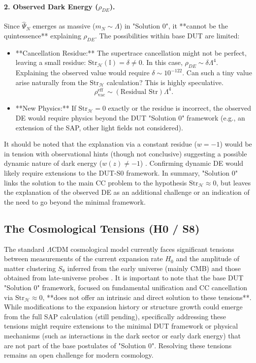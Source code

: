 \documentclass[11pt, a4paper]{article}
\theoremstyle{remark}
\newcommand{\Op}[1]{\hat{#1}}
\newcommand{\Str}{\mathrm{Str}}
\begin{document}
\paragraph{2. Observed Dark Energy (\( \rho_{DE} \)).}
Since \( \Op{\Psi}_N \) emerges as massive (\( m_N \sim \Lambda \)) in "Solution 0", it **cannot be the quintessence** explaining \( \rho_{DE} \). The possibilities within base DUT are limited:
\begin{itemize}
    \item **Cancellation Residue:** The supertrace cancellation might not be perfect, leaving a small residue: \( \Str_{\mathcal{H}}(\mathbb{I}) = \delta \neq 0 \). In this case, \( \rho_{DE} \sim \delta \Lambda^4 \). Explaining the observed value would require \( \delta \sim 10^{-122} \). Can such a tiny value arise naturally from the \( \Str_{\mathcal{H}} \) calculation? This is highly speculative.
    \begin{equation}\label{eq:residuo_vacio_final_redux}
    \rho_{\text{vac}}^{\text{eff}} \sim (\text{Residual } \Str) \Lambda^4.
    \end{equation}
    \item **New Physics:** If \( \Str_{\mathcal{H}} = 0 \) exactly or the residue is incorrect, the observed DE would require physics beyond the DUT "Solution 0" framework (e.g., an extension of the SAP, other light fields not considered).
\end{itemize}
It should be noted that the explanation via a constant residue (\(w=-1\)) would be in tension with observational hints (though not conclusive) suggesting a possible dynamic nature of dark energy (\(w(z) \neq -1\)) \citep[see e.g., analysis in][]{DESI:2024mwx, Abdalla:2022}. Confirming dynamic DE would likely require extensions to the DUT-S0 framework.
In summary, "Solution 0" links the solution to the main CC problem to the hypothesis \( \Str_{\mathcal{H}} \approx 0 \), but leaves the explanation of the observed DE as an additional challenge or an indication of the need to go beyond the minimal framework.

\subsection{The Cosmological Tensions (H0 / S8)}
\label{sec:tensiones_cosmo}
The standard $\Lambda$CDM cosmological model currently faces significant tensions between measurements of the current expansion rate \(H_0\) and the amplitude of matter clustering \(S_8\) inferred from the early universe (mainly CMB) and those obtained from late-universe probes \citep[e.g.,][]{Abdalla:2022}. It is important to note that the base DUT "Solution 0" framework, focused on fundamental unification and CC cancellation via \(\Str_{\mathcal{H}} \approx 0\), **does not offer an intrinsic and direct solution to these tensions**. While modifications to the expansion history or structure growth could emerge from the full SAP calculation (still pending), specifically addressing these tensions might require extensions to the minimal DUT framework or physical mechanisms (such as interactions in the dark sector or early dark energy) that are not part of the base postulates of "Solution 0". Resolving these tensions remains an open challenge for modern cosmology.
\end{document}
